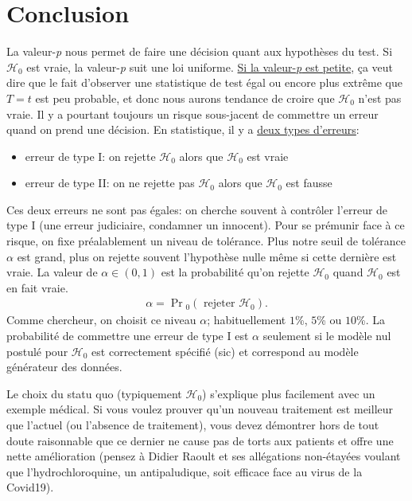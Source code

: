 \documentclass[
  11pt,
  letterpaper,
]{scrbook}
\providecommand{\tightlist}{%
  \setlength{\itemsep}{0pt}\setlength{\parskip}{0pt}}\usepackage{longtable,booktabs,array}
\theoremstyle{plain}
\theoremstyle{plain}
\theoremstyle{definition}
\theoremstyle{definition}
\theoremstyle{remark}
\begin{document}
\section{Conclusion}\label{conclusion}

La valeur-\emph{p} nous permet de faire une décision quant aux
hypothèses du test. Si \(\mathscr{H}_0\) est vraie, la valeur-\emph{p}
suit une loi uniforme. \href{https://xkcd.com/1478/}{Si la
valeur-\emph{p} est petite}, ça veut dire que le fait d'observer une
statistique de test égal ou encore plus extrême que \(T=t\) est peu
probable, et donc nous aurons tendance de croire que \(\mathscr{H}_0\)
n'est pas vraie. Il y a pourtant toujours un risque sous-jacent de
commettre un erreur quand on prend une décision. En statistique, il y a
\href{https://xkcd.com/2303/}{deux types d'erreurs}:

\begin{itemize}
\tightlist
\item
  erreur de type I: on rejette \(\mathscr{H}_0\) alors que
  \(\mathscr{H}_0\) est vraie
\item
  erreur de type II: on ne rejette pas \(\mathscr{H}_0\) alors que
  \(\mathscr{H}_0\) est fausse
\end{itemize}

Ces deux erreurs ne sont pas égales: on cherche souvent à contrôler
l'erreur de type I (une erreur judiciaire, condamner un innocent). Pour
se prémunir face à ce risque, on fixe préalablement un niveau de
tolérance. Plus notre seuil de tolérance \(\alpha\) est grand, plus on
rejette souvent l'hypothèse nulle même si cette dernière est vraie. La
valeur de \(\alpha \in (0, 1)\) est la probabilité qu'on rejette
\(\mathscr{H}_0\) quand \(\mathscr{H}_0\) est en fait vraie.
\begin{align*}
\alpha = \Pr{\!}_0\left(\text{ rejeter } \mathscr{H}_0\right).
\end{align*} Comme chercheur, on choisit ce niveau \(\alpha\);
habituellement \(1\)\%, \(5\)\% ou \(10\)\%. La probabilité de commettre
une erreur de type I est \(\alpha\) seulement si le modèle nul postulé
pour \(\mathscr{H}_0\) est correctement spécifié (sic) et correspond au
modèle générateur des données.

Le choix du statu quo (typiquement \(\mathscr{H}_0\)) s'explique plus
facilement avec un exemple médical. Si vous voulez prouver qu'un nouveau
traitement est meilleur que l'actuel (ou l'absence de traitement), vous
devez démontrer hors de tout doute raisonnable que ce dernier ne cause
pas de torts aux patients et offre une nette amélioration (pensez à
Didier Raoult et ses allégations non-étayées voulant que
l'hydrochloroquine, un antipaludique, soit efficace face au virus de la
Covid19).
\end{document}
